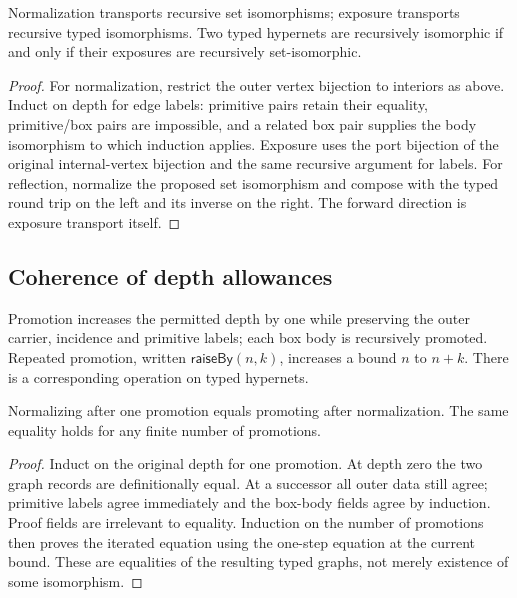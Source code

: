 \begin{theorem}
Normalization transports recursive set isomorphisms; exposure transports
recursive typed isomorphisms. Two typed hypernets are recursively isomorphic
if and only if their exposures are recursively set-isomorphic.
\end{theorem}
\begin{proof}
For normalization, restrict the outer vertex bijection to interiors as above.
Induct on depth for edge labels: primitive pairs retain their equality,
primitive/box pairs are impossible, and a related box pair supplies the body
isomorphism to which induction applies. Exposure uses the port bijection of
the original internal-vertex bijection and the same recursive argument for
labels. For reflection, normalize the proposed set isomorphism and compose
with the typed round trip on the left and its inverse on the right. The forward
direction is exposure transport itself.
\end{proof}



\subsection{Coherence of depth allowances}
\begin{definition}
Promotion increases the permitted depth by one while preserving the outer
carrier, incidence and primitive labels; each box body is recursively promoted.
Repeated promotion, written $\mathsf{raiseBy}(n,k)$, increases a bound $n$ to
$n+k$. There is a corresponding operation on typed hypernets.
\end{definition}


\begin{theorem}
Normalizing after one promotion equals promoting after normalization.
The same equality holds for any finite number of promotions.
\end{theorem}
\begin{proof}
Induct on the original depth for one promotion. At depth zero the two graph
records are definitionally equal. At a successor all outer data still agree;
primitive labels agree immediately and the box-body fields agree by induction.
Proof fields are irrelevant to equality. Induction on the number of promotions
then proves the iterated equation using the one-step equation at the current
bound. These are equalities of the resulting typed graphs, not merely
existence of some isomorphism.
\end{proof}

